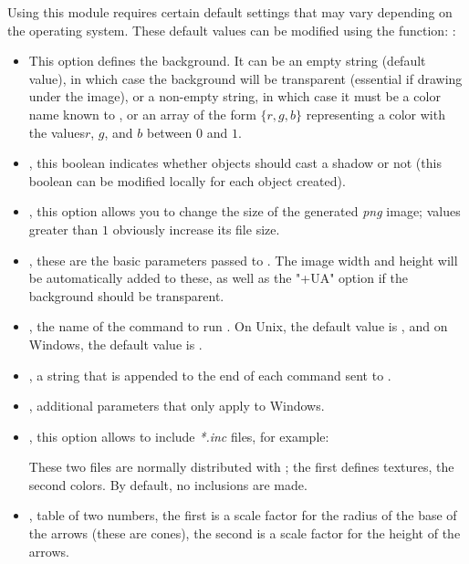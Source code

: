 Using this module requires certain default settings that may vary depending on the operating system. These default values ​​can be modified using the function:
\writeoptions :
\begin{itemize}
    \item {} This option defines the background. It can be an empty string (default value), in which case the background will be transparent (essential if drawing under the image), or a non-empty string, in which case it must be a color name known to \povray, or an array of the form $\{r,g,b\}$ representing a color with the values ​​$r$, $g$, and $b$ between $0$ and $1$.
    
    \item {}, this boolean indicates whether objects should cast a shadow or not (this boolean can be modified locally for each object created).
    
    \item {}, this option allows you to change the size of the generated \emph{png} image; values ​​greater than $1$ obviously increase its file size.
    
    \item {}, these are the basic parameters passed to \povray. The image width and height will be automatically added to these, as well as the "+UA" option if the background should be transparent.
    
    \item {}, the name of the command to run \povray. On Unix, the default value is , and on Windows, the default value is .
    
    \item {}, a string that is appended to the end of each command sent to \povray.
    
    \item {}, additional parameters that only apply to Windows.
    
    \item {}, this option allows \povray to include \emph{*.inc} files, for example: \par
    \hfil{}\hfil\par These two files are normally distributed with \povray; the first defines textures, the second colors. By default, no inclusions are made.

    \item {}, table of two numbers, the first is a scale factor for the radius of the base of the arrows (these are cones), the second is a scale factor for the height of the arrows.
\end{itemize}

